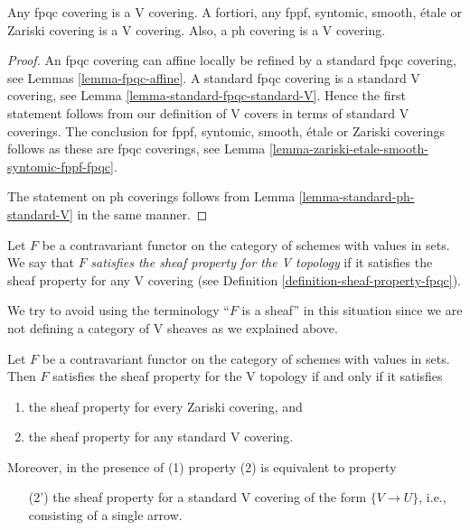 \begin{lemma}
\label{lemma-zariski-etale-smooth-syntomic-fppf-fpqc-ph-V}
Any fpqc covering is a V covering. A fortiori,
any fppf, syntomic, smooth, \'etale or Zariski covering is a V covering.
Also, a ph covering is a V covering.
\end{lemma}

\begin{proof}
An fpqc covering can affine locally be refined by a
standard fpqc covering, see Lemmas \ref{lemma-fpqc-affine}.
A standard fpqc covering is a standard V covering, see
Lemma \ref{lemma-standard-fpqc-standard-V}. Hence the first statement
follows from our definition of V covers in terms of standard V coverings.
The conclusion for fppf, syntomic, smooth, \'etale or Zariski coverings
follows as these are fpqc coverings, see
Lemma \ref{lemma-zariski-etale-smooth-syntomic-fppf-fpqc}.

\medskip\noindent
The statement on ph coverings follows from
Lemma \ref{lemma-standard-ph-standard-V} in the same manner.
\end{proof}

\begin{definition}
\label{definition-sheaf-property-V}
Let $F$ be a contravariant functor on the category
of schemes with values in sets. We say that
$F$ {\it satisfies the sheaf property for the V topology}
if it satisfies the sheaf property for any V covering
(see Definition \ref{definition-sheaf-property-fpqc}).
\end{definition}

\noindent
We try to avoid using the terminology ``$F$ is a sheaf'' in this
situation since we are not defining a category of V sheaves
as we explained above.

\begin{lemma}
\label{lemma-sheaf-property-V}
Let $F$ be a contravariant functor on the category
of schemes with values in sets. Then $F$ satisfies
the sheaf property for the V topology if and only
if it satisfies
\begin{enumerate}
\item the sheaf property for every Zariski covering, and
\item the sheaf property for any standard V covering.
\end{enumerate}
Moreover, in the presence of (1) property (2) is equivalent to
property
\begin{enumerate}
\item[(2')] the sheaf property for a standard V covering
of the form $\{V \to U\}$, i.e., consisting of a single arrow.
\end{enumerate}
\end{lemma}


